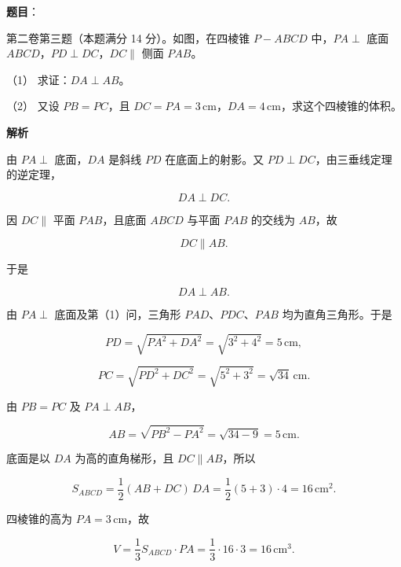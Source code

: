 \begin{answer}

\textbf{题目}：

第二卷第三题（本题满分 14 分）。如图，在四棱锥 $P-ABCD$ 中，$PA\perp$ 底面 $ABCD$，$PD\perp DC$，$DC\parallel$ 侧面 $PAB$。
\nopagebreak[4]
\begin{center}\end{center}
\nopagebreak[4]
（1） 求证：$DA\perp AB$。

（2） 又设 $PB=PC$，且 $DC=PA=3\,\mathrm{cm}$，$DA=4\,\mathrm{cm}$，求这个四棱锥的体积。

\textbf{解析}


由 $PA\perp$ 底面，$DA$ 是斜线 $PD$ 在底面上的射影。又 $PD\perp DC$，由三垂线定理的逆定理，

\nopagebreak[4]
\[
DA\perp DC.
\]

因 $DC\parallel$ 平面 $PAB$，且底面 $ABCD$ 与平面 $PAB$ 的交线为 $AB$，故

\nopagebreak[4]
\[
DC\parallel AB.
\]

于是

\nopagebreak[4]
\[
DA\perp AB.
\]


由 $PA\perp$ 底面及第（1）问，三角形 $PAD$、$PDC$、$PAB$ 均为直角三角形。于是

\nopagebreak[4]
\[
PD=\sqrt{PA^2+DA^2}
=\sqrt{3^2+4^2}=5\,\mathrm{cm},
\]

\nopagebreak[4]
\[
PC=\sqrt{PD^2+DC^2}
=\sqrt{5^2+3^2}=\sqrt{34}\,\mathrm{cm}.
\]

由 $PB=PC$ 及 $PA\perp AB$，

\nopagebreak[4]
\[
AB=\sqrt{PB^2-PA^2}
=\sqrt{34-9}=5\,\mathrm{cm}.
\]

底面是以 $DA$ 为高的直角梯形，且 $DC\parallel AB$，所以

\nopagebreak[4]
\[
S_{ABCD}
=\frac12(AB+DC)\,DA
=\frac12(5+3)\cdot4=16\,\mathrm{cm}^2.
\]

四棱锥的高为 $PA=3\,\mathrm{cm}$，故

\nopagebreak[4]
\[
V=\frac13S_{ABCD}\cdot PA
=\frac13\cdot16\cdot3
=16\,\mathrm{cm}^3.
\]



\end{answer}
